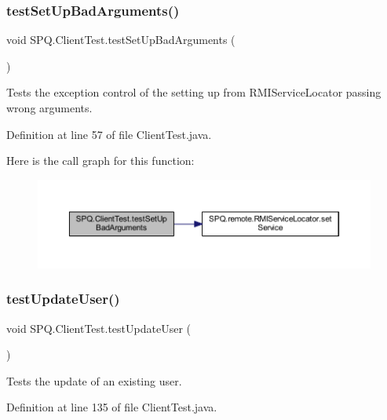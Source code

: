 \subsubsection{\texorpdfstring{test\+Set\+Up\+Bad\+Arguments()}{testSetUpBadArguments()}}
{\footnotesize\ttfamily void S\+P\+Q.\+Client\+Test.\+test\+Set\+Up\+Bad\+Arguments (\begin{DoxyParamCaption}{ }\end{DoxyParamCaption})}

Tests the exception control of the setting up from R\+M\+I\+Service\+Locator passing wrong arguments. 

Definition at line 57 of file Client\+Test.\+java.

Here is the call graph for this function\+:
\nopagebreak
\begin{figure}[H]
\begin{center}
\leavevmode
\includegraphics[width=350pt]{class_s_p_q_1_1_client_test_add97afff5978c2f1b8e950cc4942eda5_cgraph}
\end{center}
\end{figure}
\mbox{\label{class_s_p_q_1_1_client_test_ab6d14403cd66b3b0ab32f8022902588f}} 
\subsubsection{\texorpdfstring{test\+Update\+User()}{testUpdateUser()}}
{\footnotesize\ttfamily void S\+P\+Q.\+Client\+Test.\+test\+Update\+User (\begin{DoxyParamCaption}{ }\end{DoxyParamCaption})}

Tests the update of an existing user. 

Definition at line 135 of file Client\+Test.\+java.

